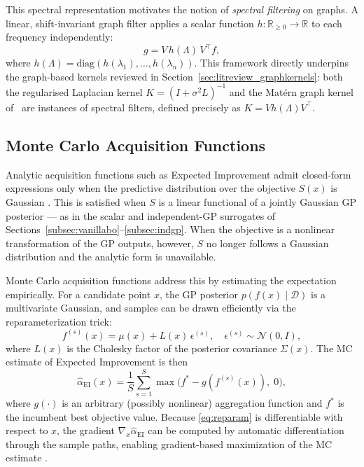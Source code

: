 \documentclass[11pt]{article}
\begin{document}
This spectral representation motivates the notion of \emph{spectral 
filtering} on graphs. A linear, shift-invariant graph filter applies a 
scalar function $h : \mathbb{R}_{\geq 0} \to \mathbb{R}$ to each 
frequency independently:
\[
    g = V\, h(\Lambda)\, V^{\top} f,
\]
where $h(\Lambda) = \mathrm{diag}(h(\lambda_1), \ldots, h(\lambda_n))$. 
This framework directly underpins the graph-based kernels reviewed in 
Section~\ref{sec:litreview_graphkernels}: both the regularised Laplacian 
kernel $K = (I + \sigma^2 L)^{-1}$ and the Mat\'{e}rn graph kernel 
of~\textcite{borovitskiy2021matern} are instances of spectral filters, 
defined precisely as $K = V h(\Lambda) V^{\top}$.





\subsection{Monte Carlo Acquisition Functions}
\label{sec:mc-acq}

Analytic acquisition functions such as Expected Improvement admit closed-form expressions
only when the predictive distribution over the objective $S(x)$ is Gaussian
\parencite{garnett2023bayesian}. This is satisfied when $S$ is a linear functional of a jointly
Gaussian GP posterior — as in the scalar and independent-GP surrogates of
Sections~\ref{subsec:vanillabo}--\ref{subsec:indgp}. When the objective is a nonlinear
transformation of the GP outputs, however, $S$ no longer follows a Gaussian distribution
and the analytic form is unavailable.

Monte Carlo acquisition functions address this by estimating the expectation empirically.
For a candidate point $x$, the GP posterior $p(f(x) \mid \mathcal{D})$ is a multivariate
Gaussian, and samples can be drawn efficiently via the reparameterization trick:
\begin{equation}
  f^{(s)}(x) = \mu(x) + L(x)\, \epsilon^{(s)}, \quad
  \epsilon^{(s)} \sim \mathcal{N}(0, I),
  \label{eq:reparam}
\end{equation}
where $L(x)$ is the Cholesky factor of the posterior covariance $\Sigma(x)$. The MC
estimate of Expected Improvement is then
\begin{equation}
  \widehat{\alpha}_{\mathrm{EI}}(x) = \frac{1}{S} \sum_{s=1}^{S}
  \max\!\bigl(f^* - g(f^{(s)}(x)),\; 0\bigr),
  \label{eq:mc-ei}
\end{equation}
where $g(\cdot)$ is an arbitrary (possibly nonlinear) aggregation function and $f^*$ is
the incumbent best objective value. Because \eqref{eq:reparam} is differentiable with
respect to $x$, the gradient $\nabla_x \widehat{\alpha}_{\mathrm{EI}}$ can be computed by
automatic differentiation through the sample paths, enabling gradient-based maximization
of the MC estimate \parencite{Wilson2018, Balandat2020}.
\end{document}
